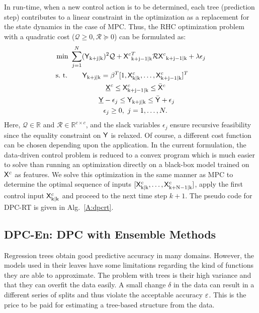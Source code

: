 In run-time, when a new control action is to be determined, each tree (prediction step) contributes to a linear constraint in the optimization as a replacement for the state dynamics in the case of MPC. Thus, the RHC optimization problem with a quadratic cost ($\mathcal{Q} \geq 0, \mathcal{R} \succeq 0$) can be formulated as:
\begin{align}
\begin{aligned}
\text{min } & \sum_{j=1}^{N} ({\mathsf{Y}}_{\mathrm{k+j|k}})^2 \mathcal{Q} + {\mathsf{X}^c}^T_{\mathrm{k+j-1|k}} \mathcal{R} {\mathsf{X}^c}_{\mathrm{k+j-1|k}} +  \lambda\epsilon_j\\
\text{s.~t. } & \ \ \ \ \ \mathsf{Y}_{\mathrm{k+j|k}} =  \beta^T [1,\mathsf{X}^c_{\mathrm{k|k}},\dots,\mathsf{X}^c_{\mathrm{k+j-1|k}} ]^T \\
& \ \ \ \ \ \ \ \ \ \ \ \ \ \ \ \underline{\mathsf{X}}^c \leq \mathsf{X}^c_{\mathrm{k+j-1|k}} \leq \bar{\mathsf{X}}^c\\ 
& \ \ \ \ \ \ \ \ \ \ \ \ \underline{\mathsf{Y}}-\epsilon_j \leq \mathsf{Y}_{\mathrm{k+j|k}} \leq \bar{\mathsf{Y}} + \epsilon_j\\\
& \ \ \ \ \ \ \ \ \ \ \ \ \ \ \epsilon_j \geq 0, \ j = 1,\dots,N.
\end{aligned}
\label{E:dpcrt}
\end{align}
Here, $\mathcal{Q} \in \mathbb{R}$ and $\mathcal{R} \in \mathbb{R}^{c \times c}$, and the slack variables $\epsilon_j$ ensure recursive feasibility since the equality constraint on $\mathsf{Y}$ is relaxed. Of course, a different cost function can be chosen depending upon the application. In the current formulation, the data-driven control problem is reduced to a convex program which is much easier to solve than running an optimization directly on a black-box model trained on $\mathsf{X}^c$ as features. We solve this optimization in the same manner as MPC to determine the optimal sequence of inputs $[\mathsf{X}^c_{\mathrm{k|k}},\dots,\mathsf{X}^c_{\mathrm{k+N-1|k}}]$, apply the first control input $\mathsf{X}^c_{\mathrm{k|k}}$ and proceed to the next time step $k+1$. The pseudo code for DPC-RT is given in Alg.~\ref{A:dpcrt}.

\subsection{DPC-En: DPC with Ensemble Methods}
\label{SS:dpcrf}
Regression trees obtain good predictive accuracy in many domains. However, the models used in their leaves have some limitations regarding the kind of functions they are able to approximate.
The problem with trees is their high variance and that they can overfit the data easily.
A small change $\delta$ in the data can result in a different series of splits and thus violate the acceptable accuracy $\varepsilon$.
This is the price to be paid for estimating a tree-based structure from the data.

